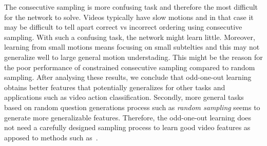 The consecutive sampling is more confusing task and therefore the most difficult for the network to solve.
Videos typically have slow motions and in that case it may be difficult to tell apart correct vs incorrect ordering using consecutive sampling.  
With such a confusing task, the network might learn little. Moreover, learning from small motions means focusing on small subtelties and this may not generalize well to large general motion understading. This might be the reason for the poor performance of constrained consecutive sampling compared to random sampling.
After analysing these results, we conclude that odd-one-out learning obtains better features that potentially generalizes for other tasks and applications such as video action classification. 
Secondly, more general  tasks based on random question generations process such as \emph{random sampling} seems to generate more generalizable features.
Therefore, the odd-one-out learning does not need a carefully designed sampling process to learn good video features as apposed to methods such as~\cite{Misra2016}.

